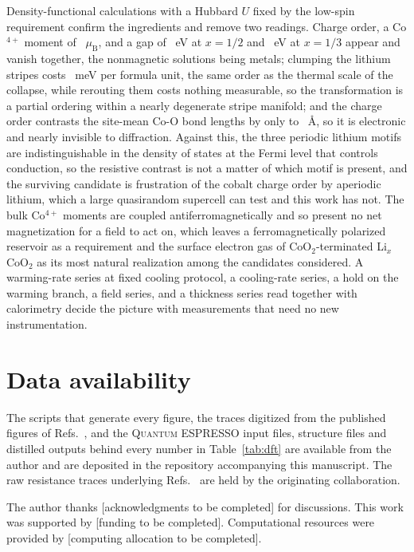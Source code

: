 \documentclass[reprint,twocolumn,prb,amsmath,amssymb,superscriptaddress,floatfix]{revtex4-2}
\newcommand{\muBs}{\mu_{\mathrm{B}}}
\begin{document}
Density-functional calculations with a Hubbard $U$ fixed by the low-spin requirement confirm the
ingredients and remove two readings. Charge order, a Co$^{4+}$ moment of \comomentRow~$\muBs$,
and a gap of \gapRow~eV at $x=1/2$ and \gapXthird~eV at $x=1/3$ appear and vanish together, the
nonmagnetic solutions being metals; clumping the lithium stripes costs \deltaEClumped~meV per
formula unit, the same order as the thermal scale of the collapse, while rerouting them costs
nothing measurable, so the transformation is a partial ordering within a nearly degenerate
stripe manifold; and the charge order contrasts the site-mean Co-O bond lengths by only
\bondRow{} to \bondXthird~\AA, so it is electronic and nearly invisible to diffraction. Against
this, the three periodic lithium motifs are indistinguishable in the density of states at the
Fermi level that controls conduction, so the resistive contrast is not a matter of which motif
is present, and the surviving candidate is frustration of the cobalt charge order by aperiodic
lithium, which a large quasirandom supercell can test and this work has not. The bulk Co$^{4+}$
moments are coupled antiferromagnetically and so present no net magnetization for a field to act
on, which leaves a ferromagnetically polarized reservoir as a requirement and the surface
electron gas of CoO$_2$-terminated Li$_x$CoO$_2$ as its most natural realization among the
candidates considered. A warming-rate series at fixed cooling protocol, a cooling-rate series, a
hold on the warming branch, a field series, and a thickness series read together with
calorimetry decide the picture with measurements that need no new instrumentation.

\section*{Data availability}

The scripts that generate every figure, the traces digitized from the published figures of
Refs.~\cite{Crowley2020,RadhaPerspective2021}, and the \textsc{Quantum ESPRESSO} input files,
structure files and distilled outputs behind every number in Table~\ref{tab:dft} are available
from the author and are deposited in the repository accompanying this manuscript. The raw
resistance traces underlying Refs.~\cite{Crowley2020,RadhaPerspective2021} are held by the
originating collaboration.

\begin{acknowledgments}
The author thanks [acknowledgments to be completed] for discussions. This work was supported by
[funding to be completed]. Computational resources were provided by [computing allocation to be
completed].
\end{acknowledgments}



\end{document}
